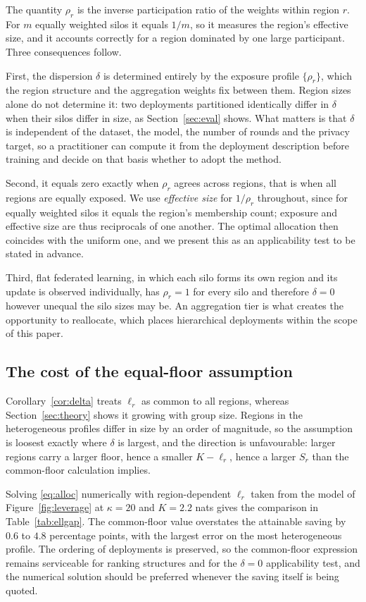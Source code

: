 \documentclass[acmsmall,screen,review,anonymous]{acmart}
\theoremstyle{acmdefinition}%
\begin{document}
The quantity $\rho_r$ is the inverse
participation ratio of the weights within region $r$. For $m$ equally weighted silos it equals $1/m$, so it measures the
region's effective size, and it accounts correctly for a region dominated by one
large participant. Three consequences follow.

First, the dispersion $\delta$ is determined entirely by the exposure profile
$\{\rho_r\}$, which the region structure and the aggregation weights fix between
them. Region sizes alone do not determine it: two deployments partitioned
identically differ in $\delta$ when their silos differ in size, as
Section~\ref{sec:eval} shows. What matters is that $\delta$ is independent of the
dataset, the model, the number of rounds and the privacy target, so a practitioner
can compute it from the deployment description before training and decide on that
basis whether to adopt the method.

Second, it equals zero exactly when $\rho_r$ agrees across regions, that is when
all regions are equally exposed. We use \emph{effective size} for $1/\rho_r$
throughout, since for equally weighted silos it equals the region's membership count;
exposure and effective size are thus reciprocals of one another. The optimal allocation then coincides
with the uniform one, and we present this as an applicability test to be stated
in advance.

Third, flat federated learning, in which each silo forms its own region and its
update is observed individually, has $\rho_r = 1$ for every silo and therefore
$\delta = 0$ however unequal the silo sizes may be. An aggregation tier is what
creates the opportunity to reallocate, which places hierarchical deployments
within the scope of this paper.

\subsection{The cost of the equal-floor assumption}

Corollary~\ref{cor:delta} treats $\ell_r$ as common to all regions, whereas
Section~\ref{sec:theory} shows it growing with group size. Regions in the
heterogeneous profiles differ in size by an order of magnitude, so the assumption
is loosest exactly where $\delta$ is largest, and the direction is unfavourable:
larger regions carry a larger floor, hence a smaller $K - \ell_r$, hence a larger
$S_r$ than the common-floor calculation implies.

Solving \eqref{eq:alloc} numerically with region-dependent $\ell_r$ taken from the
model of Figure~\ref{fig:leverage} at $\kappa = 20$ and $K = 2.2$ nats gives the
comparison in Table~\ref{tab:ellgap}. The common-floor value overstates the
attainable saving by $0.6$ to $4.8$ percentage points, with the largest error on
the most heterogeneous profile. The ordering of deployments is preserved, so the
common-floor expression remains serviceable for ranking structures and for the
$\delta = 0$ applicability test, and the numerical solution should be preferred
whenever the saving itself is being quoted.
\end{document}
